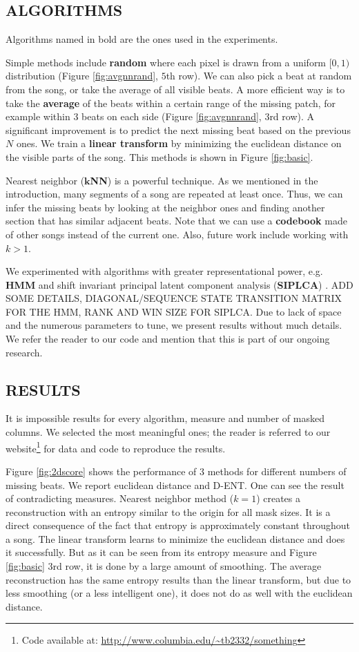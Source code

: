\documentclass{article}
\begin{document}
\subsection{ALGORITHMS}
\label{ssec:algo}
Algorithms named in bold are the ones used in the experiments.

Simple methods include \textbf{random} where each pixel is drawn from a uniform $[0,1)$
distribution (Figure \ref{fig:avgnnrand}, $5$th row). 
We can also pick a beat at random from the song, or take the average
of all visible beats. A more efficient way is to take the \textbf{average} of the beats
within a certain range of the missing patch, for example within $3$ beats on each
side (Figure \ref{fig:avgnnrand}, $3$rd row).
A significant improvement is to predict the next missing beat based on the
previous $N$ ones. We train a \textbf{linear transform} by minimizing the euclidean distance
on the visible parts of the song. This methods is shown in Figure \ref{fig:basic}.

Nearest neighbor ($\mathbf{k}$\textbf{NN}) is a powerful technique. 
As we mentioned in the introduction, many segments
of a song are repeated at least once. Thus, we can infer the missing beats by looking at
the neighbor ones and finding another section that has similar adjacent beats. Note
that we can use a \textbf{codebook} made of other songs instead of the current one. Also, future
work include working with $k > 1$.

We experimented with algorithms with greater representational power, e.g. \textbf{HMM} and
shift invariant principal latent component analysis (\textbf{SIPLCA}) \cite{Weiss2010}.
ADD SOME DETAILS, DIAGONAL/SEQUENCE STATE TRANSITION MATRIX FOR THE HMM, 
RANK AND WIN SIZE FOR SIPLCA.
Due to lack of space and the numerous parameters to tune, we present results without
much details. We refer the reader to our code and mention that this is part of our
ongoing research.


\subsection{RESULTS}
\label{ssec:results}
It is impossible results for every algorithm, measure and number of masked columns.
We selected the most meaningful ones; the reader is referred to our 
website\footnote{Code available at: \url{http://www.columbia.edu/~tb2332/something}}
for data and code to reproduce the results.

Figure \ref{fig:2dscore} shows the performance of $3$ methods for different numbers
of missing beats. We report euclidean distance and D-ENT. One can see the result
of contradicting measures. Nearest neighbor method ($k=1$) creates a reconstruction
with an entropy similar to the origin for all mask sizes. It is a direct consequence
of the fact that entropy is approximately constant throughout a song. The linear
transform learns to minimize the euclidean distance and does it successfully. But as it
can be seen from its entropy measure and Figure \ref{fig:basic} $3$rd row, it is
done by a large amount of smoothing. The average reconstruction has the same entropy
results than the linear transform, but due to less smoothing (or a less intelligent
one), it does not do as well with the euclidean distance.
\end{document}
